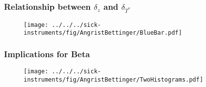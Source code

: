 \documentclass{beamer}
\begin{document}
\begin{frame}
  \frametitle{Relationship between $\delta_{z}$ and $\delta_{T^*}$}
\begin{figure}[h]
  \centering
  \texttt{[image: ../../../sick-instruments/fig/AngristBettinger/BlueBar.pdf]}
\end{figure}
\end{frame}
\begin{frame}
  \frametitle{Implications for Beta} 
\begin{figure}[h]
  \centering
  \texttt{[image: ../../../sick-instruments/fig/AngristBettinger/TwoHistograms.pdf]}
\end{figure}
\end{frame}
\end{document}
